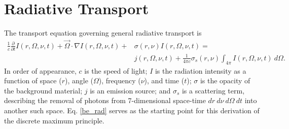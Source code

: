 \section{Radiative Transport }
The transport equation governing general radiative transport is
\small
\begin{align}
 \frac{1}{c}\frac{\partial}{\partial t}I(r,\Omega,\nu,t) +
   \vec\Omega\cdot\nabla I(r,\Omega,\nu,t) + 
   &\sigma(r,\nu)I(r,\Omega,\nu,t) = \nonumber\\
   &j(r,\Omega,\nu,t) + 
   \frac{1}{4\pi c}\sigma_s(r,\nu)
     \int_{4\pi}I(r,\Omega,\nu,t)\ d\Omega \label{be_rad}.
\end{align}
\normalsize
In order of appearance, $c$ is the speed of light; $I$ is the radiation
intensity as a function of space ($r$), angle ($\Omega$), frequency ($\nu$), and
time ($t$); $\sigma$ is the opacity of the background material; $j$ is an
emission source; and $\sigma_s$ is a scattering term, describing the removal of
photons from 7-dimensional space-time $dr\ d\nu\ d\Omega\ dt$ into another such
space. Eq. \eqref{be_rad} serves as the starting point for this derivation of
the
discrete maximum principle.

